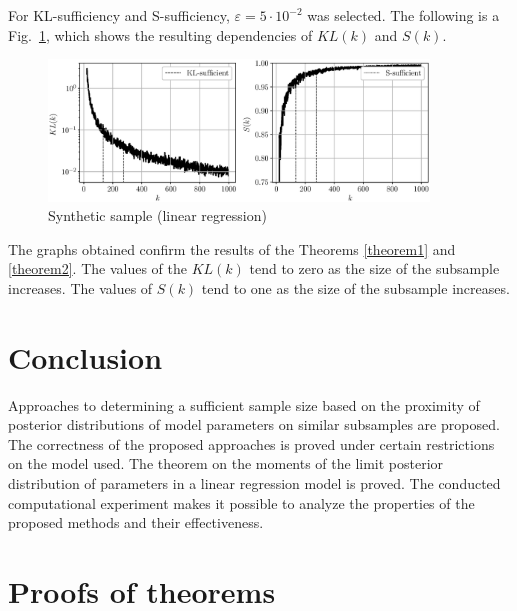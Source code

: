\documentclass[
11pt,%
tightenlines,%
twoside,%
onecolumn,%
nofloats,%
nobibnotes,%
nofootinbib,%
superscriptaddress,%
noshowpacs,%
centertags]%
{revtex4-2}
\begin{document}
For KL-sufficiency and S-sufficiency, $\varepsilon = 5 \cdot 10^{-2}$ was selected. The following is a Fig.~\ref{synthetic-regression-sufficient}, which shows the resulting dependencies of $KL(k)$ and $S(k)$. 

\begin{figure}[h!]
    \centering
    \includegraphics[width=0.9\textwidth]{../paper/figures/gray/eps/synthetic-regression-sufficient-KL-S}
    \caption{Synthetic sample (linear regression)}
    \label{synthetic-regression-sufficient}
\end{figure}

The graphs obtained confirm the results of the Theorems \ref{theorem1} and \ref{theorem2}. The values of the $KL(k)$ tend to zero as the size of the subsample increases. The values of $S(k)$ tend to one as the size of the subsample increases.

\section{Conclusion}

Approaches to determining a sufficient sample size based on the proximity of posterior distributions of model parameters on similar subsamples are proposed. The correctness of the proposed approaches is proved under certain restrictions on the model used. The theorem on the moments of the limit posterior distribution of parameters in a linear regression model is proved. The conducted computational experiment makes it possible to analyze the properties of the proposed methods and their effectiveness.

\appendix

\section{Proofs of theorems}\label{append}
\end{document}
